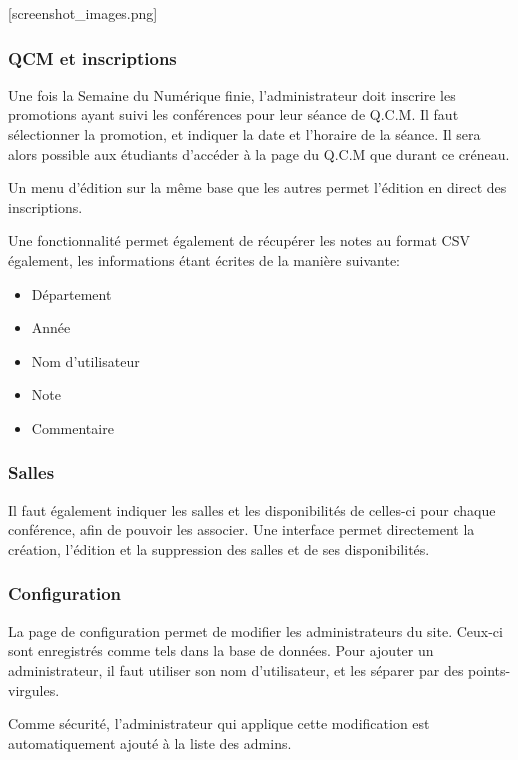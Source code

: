 [screenshot\_images.png]

            \subsubsection{QCM et inscriptions}

Une fois la Semaine du Numérique finie, l'administrateur doit inscrire les promotions ayant suivi les conférences pour leur
séance de Q.C.M. Il faut sélectionner la promotion, et indiquer la date et l'horaire de la séance. Il sera alors possible aux étudiants d'accéder à la page du Q.C.M que durant ce créneau.

Un menu d'édition sur la même base que les autres permet l'édition en direct des inscriptions.

Une fonctionnalité permet également de récupérer les notes au format CSV également, les informations étant écrites de la manière suivante:

    \begin{itemize}
    \item Département
    \item Année
    \item Nom d'utilisateur
    \item Note
    \item Commentaire
    \end{itemize}

            \subsubsection{Salles}

Il faut également indiquer les salles et les disponibilités de celles-ci pour chaque conférence, afin de pouvoir les associer.
Une interface permet directement la création, l'édition et la suppression des salles et de ses disponibilités.

            \subsubsection{Configuration}

La page de configuration permet de modifier les administrateurs du site. Ceux-ci sont enregistrés comme tels dans la base de données.
Pour ajouter un administrateur, il faut utiliser son nom d'utilisateur, et les séparer par des points-virgules.

Comme sécurité, l'administrateur qui applique cette modification est automatiquement ajouté à la liste des admins.

